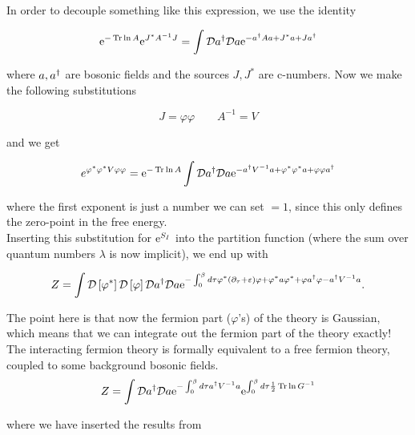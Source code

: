 In order to decouple something like this expression, we use the identity

\begin{align*}
    \mathrm{e}^{-\Tr \ln A}\mathrm{e}^{J^*A^{-1}J} = \int \mathcal{D} a^{\dagger} \mathcal{D} a \mathrm{e}^{-a^{\dagger}Aa + J^*a + Ja^{\dagger}}
\end{align*}

where $a,a^{\dagger}$ are bosonic fields and the sources $J, J^*$ are c-numbers. Now we make the following substitutions 

\begin{equation*}
    J = \varphi \varphi \quad \quad  A^{-1} = V
\end{equation*}

and we get

\begin{equation*}
    e^{\varphi^* \varphi^* V \varphi \varphi}  = \mathrm{e}^{-\Tr \ln A} \int \mathcal{D} a^{\dagger} \mathcal{D} a \mathrm{e}^{-a^{\dagger}V^{-1}a + \varphi^* \varphi^*a + \varphi \varphi a^{\dagger}}
\end{equation*}

where the first exponent is just a number we can set $=1$, since this only defines the zero-point in the free energy. \\ 

Inserting this substitution for $\mathrm{e}^{S_I}$ into the partition function (where the sum over quantum numbers $\lambda$ is now implicit), we end up with 

\begin{equation*}
    Z = \int \mathcal{D} \left[ \varphi^*\right] \mathcal{D} \left[\varphi\right]\mathcal{D} a^{\dagger} \mathcal{D} a \mathrm{e}^{- \int_0^\beta d\tau \varphi^*(\partial_\tau + \varepsilon)\varphi + \varphi^*a\varphi^* + \varphi a^{\dagger} \varphi - a^{\dagger} V^{-1}a}. 
\end{equation*}

The point here is that now the fermion part ($\varphi$'s) of the theory is Gaussian, which means that we can integrate out the fermion part of the theory exactly! The interacting fermion theory is formally equivalent to a free fermion theory, coupled to some background bosonic fields. \\ 

\begin{equation}
    Z = \int \mathcal{D} a^{\dagger} \mathcal{D} a \mathrm{e}^{-\int_0^\beta d\tau a^{\dagger} V^{-1} a} \mathrm{e}^{\int_0^\beta d\tau \frac{1}{2}\Tr \ln G^{-1}}
\end{equation}

where we have inserted the results from 

